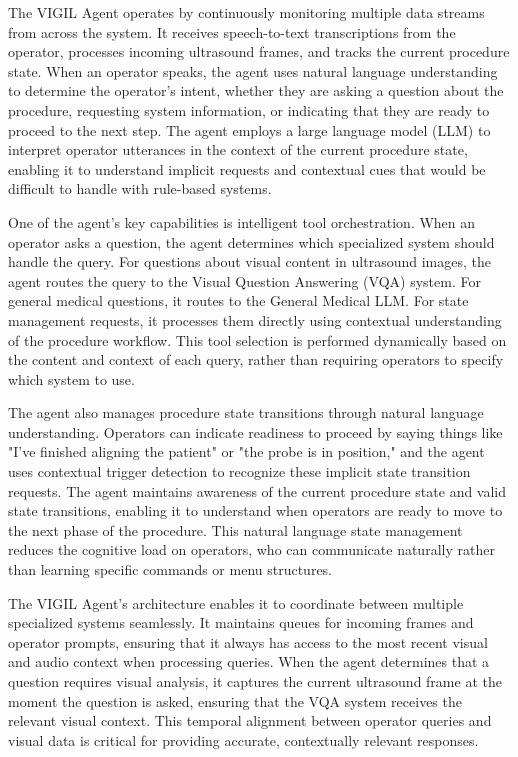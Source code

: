 \documentclass[12pt,a4paper]{article}
\begin{document}
The VIGIL Agent operates by continuously monitoring multiple data streams from across the system. It receives speech-to-text transcriptions from the operator, processes incoming ultrasound frames, and tracks the current procedure state. When an operator speaks, the agent uses natural language understanding to determine the operator's intent, whether they are asking a question about the procedure, requesting system information, or indicating that they are ready to proceed to the next step. The agent employs a large language model (LLM) to interpret operator utterances in the context of the current procedure state, enabling it to understand implicit requests and contextual cues that would be difficult to handle with rule-based systems.

One of the agent's key capabilities is intelligent tool orchestration. When an operator asks a question, the agent determines which specialized system should handle the query. For questions about visual content in ultrasound images, the agent routes the query to the Visual Question Answering (VQA) system. For general medical questions, it routes to the General Medical LLM. For state management requests, it processes them directly using contextual understanding of the procedure workflow. This tool selection is performed dynamically based on the content and context of each query, rather than requiring operators to specify which system to use.

The agent also manages procedure state transitions through natural language understanding. Operators can indicate readiness to proceed by saying things like "I've finished aligning the patient" or "the probe is in position," and the agent uses contextual trigger detection to recognize these implicit state transition requests. The agent maintains awareness of the current procedure state and valid state transitions, enabling it to understand when operators are ready to move to the next phase of the procedure. This natural language state management reduces the cognitive load on operators, who can communicate naturally rather than learning specific commands or menu structures.

The VIGIL Agent's architecture enables it to coordinate between multiple specialized systems seamlessly. It maintains queues for incoming frames and operator prompts, ensuring that it always has access to the most recent visual and audio context when processing queries. When the agent determines that a question requires visual analysis, it captures the current ultrasound frame at the moment the question is asked, ensuring that the VQA system receives the relevant visual context. This temporal alignment between operator queries and visual data is critical for providing accurate, contextually relevant responses.
\end{document}
